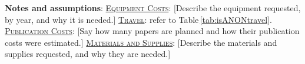 
\begin{isANONnonlabor}
\caption{
\normalsize \newline \newline
\textbf{Notes and assumptions}:
\newline \newline
{\color{red}\underline{\scshape{Equipment Costs}}: [Describe the equipment requested, by year, and why it is needed.]}
\newline \newline
\underline{\scshape{Travel}}: refer to Table\,\ref{tab:isANONtravel}. \newline \newline
{\color{red}\underline{\scshape{Publication Costs}}: [Say how many papers are planned and how their publication costs were estimated.]}
\newline \newline
{\color{red}\underline{\scshape{Materials and Supplies}}: [Describe the materials and supplies requested, and why they are needed.]}}
\label{tab:isANONnonlabor}
\end{isANONnonlabor}
